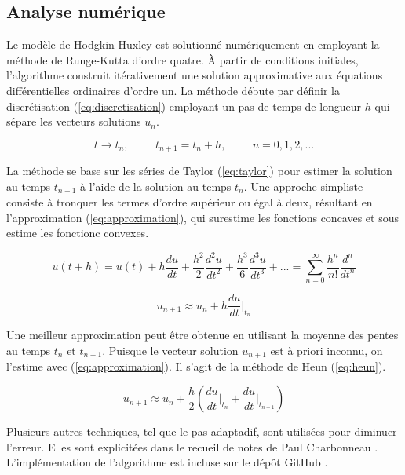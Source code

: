 \documentclass{article}
\begin{document}
\subsection{Analyse numérique}\label{subsec:analyse}

Le modèle de Hodgkin-Huxley est solutionné numériquement en employant la méthode de Runge-Kutta d'ordre quatre. À partir de conditions initiales, l'algorithme construit itérativement une solution approximative aux équations différentielles ordinaires d'ordre un. La méthode débute par définir la discrétisation (\ref{eq:discretisation}) employant un pas de temps de longueur $h$ qui sépare les vecteurs solutions $u_n$.

\begin{equation}
t \rightarrow t_n,\hspace{1cm} t_{n+1} = t_n + h,\hspace{1cm} n = 0,1,2,...
\label{eq:discretisation}
\end{equation}

La méthode se base sur les séries de Taylor (\ref{eq:taylor}) pour estimer la solution au temps $t_{n+1}$ à l'aide de la solution au temps $t_{n}$. Une approche simpliste consiste à tronquer les termes d'ordre supérieur ou égal à deux, résultant en l'approximation (\ref{eq:approximation}), qui surestime les fonctions concaves et sous estime les fonctionc convexes.

\begin{equation}
	u(t+h) = u(t) + h \frac{du}{dt} + \frac{h^2}{2}\frac{d^2u}{dt^2} + \frac{h^3}{6}\frac{d^3u}{dt^3} + ... = \sum_{n=0}^{\infty} \frac{h^n}{n!}\frac{d^n}{dt^n}
	\label{eq:taylor}
\end{equation}

\begin{equation}
	u_{n+1} \approx u_n + h \frac{du}{dt}\rvert_{t_n}
	\label{eq:approximation}
\end{equation}

Une meilleur approximation peut être obtenue en utilisant la moyenne des pentes au temps $t_n$ et $t_{n+1}$. Puisque le vecteur solution $u_{n+1}$ est à priori inconnu, on l'estime avec (\ref{eq:approximation}). Il s'agit de la méthode de Heun (\ref{eq:heun}).

\begin{equation}
	u_{n+1} \approx u_n + \frac{h}{2}(\frac{du}{dt}\rvert_{t_n} + \frac{du}{dt}\rvert_{t_{n+1}})
	\label{eq:heun}
\end{equation}

Plusieurs autres techniques, tel que le pas adaptadif,  sont utilisées pour diminuer l'erreur. Elles sont explicitées dans le recueil de notes de Paul Charbonneau \cite{notes_cours}. L'implémentation de l'algorithme est incluse sur le dépôt GitHub \cite{github}.
\end{document}
